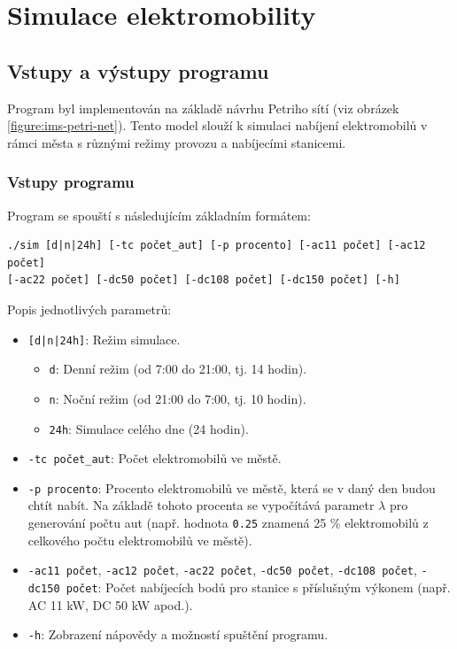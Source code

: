 \documentclass[a4paper,11pt]{article}
\begin{document}
\section{Simulace elektromobility}

\subsection{Vstupy a výstupy programu}

Program byl implementován na základě návrhu Petriho sítí (viz obrázek \ref{figure:ims-petri-net}). Tento model slouží k simulaci nabíjení elektromobilů v rámci města s různými režimy provozu a nabíjecími stanicemi.

\subsubsection{Vstupy programu}

Program se spouští s následujícím základním formátem:

\begin{verbatim}
./sim [d|n|24h] [-tc počet_aut] [-p procento] [-ac11 počet] [-ac12 počet]
[-ac22 počet] [-dc50 počet] [-dc108 počet] [-dc150 počet] [-h]
\end{verbatim}

Popis jednotlivých parametrů:
\begin{itemize}
    \item \texttt{[d|n|24h]}: Režim simulace.
    \begin{itemize}
        \item \texttt{d}: Denní režim (od 7:00 do 21:00, tj. 14 hodin).
        \item \texttt{n}: Noční režim (od 21:00 do 7:00, tj. 10 hodin).
        \item \texttt{24h}: Simulace celého dne (24 hodin).
    \end{itemize}
    \item \texttt{-tc počet\_aut}: Počet elektromobilů ve městě.
    \item \texttt{-p procento}: Procento elektromobilů ve městě, která se v daný den budou chtít nabít. Na základě tohoto procenta se vypočítává parametr \(\lambda\) pro generování počtu aut (např. hodnota \texttt{0.25} znamená 25 \% elektromobilů z celkového počtu elektromobilů ve městě).
    \item \texttt{-ac11 počet}, \texttt{-ac12 počet}, \texttt{-ac22 počet}, \texttt{-dc50 počet}, \texttt{-dc108 počet}, \texttt{-dc150 počet}: Počet nabíjecích bodů pro stanice s příslušným výkonem (např. AC 11 kW, DC 50 kW apod.).
    \item \texttt{-h}: Zobrazení nápovědy a možností spuštění programu.
\end{itemize}
\end{document}
